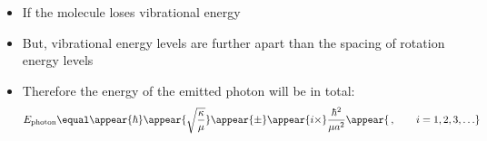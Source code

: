 \begin{frame}
\frametitle{\texorpdfstring{\culine[\sectiontitleulinecolor]{\sectiontitle}}{\sectiontitle} }

\begin{itemize}
	\item If the molecule loses vibrational energy

\item But, vibrational energy levels are further apart than the spacing of rotation energy levels

\item Therefore the energy of the emitted photon will be in total:
\[ 
 E_{\text {photon}}  \equal \appear{\hbar} \appear{\sqrt{\frac{\kappa}{\mu}}} \appear{\pm} \appear{i \times} \frac{\hbar^{2}}{\mu a^{2}}  \appear{\,, \qquad i=1,2,3, \ldots }
 \]
\end{itemize}


\endofslide 
\end{frame}

